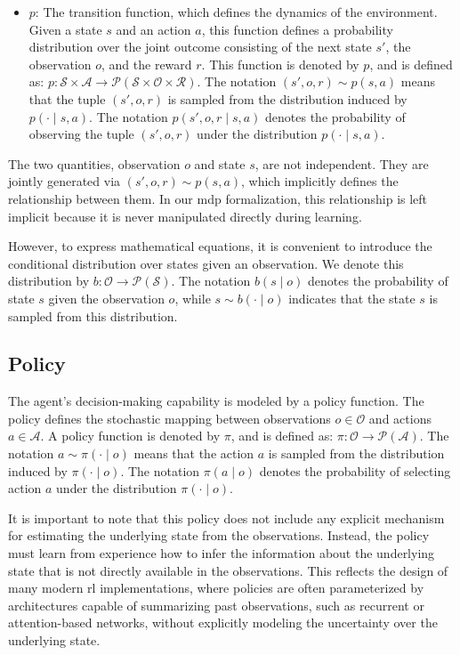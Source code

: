 \begin{itemize}
    \item \textbf{\(p\)}: The transition function, which defines the dynamics of the environment.  
    Given a state \(s\) and an action \(a\), this function defines a probability distribution over the joint outcome consisting of the next state \(s'\), the observation \(o\), and the reward \(r\).  
    This function is denoted by \(p\), and is defined as:
    \(
    p : \mathcal{S} \times \mathcal{A} \to \mathcal{P}(\mathcal{S} \times \mathcal{O} \times \mathcal{R}).
    \)
    The notation \((s', o, r) \sim p(s, a)\) means that the tuple \((s', o, r)\) is sampled from the distribution induced by \(p(\cdot \mid s, a)\).  
    The notation \(p(s', o, r \mid s, a)\) denotes the probability of observing the tuple \((s', o, r)\) under the distribution \(p(\cdot \mid s, a)\).
\end{itemize}

The two quantities, observation \(o\) and state \(s\), are not independent.
They are jointly generated via \((s', o, r) \sim p(s, a)\), which implicitly defines the relationship between them.
In our \gls{mdp} formalization, this relationship is left implicit because it is never manipulated directly during learning.

However, to express mathematical equations, it is convenient to introduce the conditional distribution over states given an observation.
We denote this distribution by
\(b : \mathcal{O} \rightarrow \mathcal{P}(\mathcal{S}).\)
The notation \(b(s \mid o)\) denotes the probability of state \(s\) given the observation \(o\), while \(s \sim b(\cdot \mid o)\) indicates that the state \(s\) is sampled from this distribution.

\subsection{Policy}
\label{subsec:policy}

The agent’s decision-making capability is modeled by a policy function.  
The policy defines the stochastic mapping between observations \(o \in \mathcal{O}\) and actions \(a \in \mathcal{A}\).  
A policy function is denoted by \(\pi\), and is defined as:
\(
\pi : \mathcal{O} \to \mathcal{P}(\mathcal{A}).
\)
The notation \(a \sim \pi(\cdot \mid o)\) means that the action \(a\) is sampled from the distribution induced by \(\pi(\cdot \mid o)\).  
The notation \(\pi(a \mid o)\) denotes the probability of selecting action \(a\) under the distribution \(\pi(\cdot \mid o)\).

It is important to note that this policy does not include any explicit mechanism for estimating the underlying state from the observations.
Instead, the policy must learn from experience how to infer the information about the underlying state that is not directly available in the observations.
This reflects the design of many modern \gls{rl} implementations, where policies are often parameterized by architectures capable of summarizing past observations, such as recurrent or attention-based networks, without explicitly modeling the uncertainty over the underlying state.


